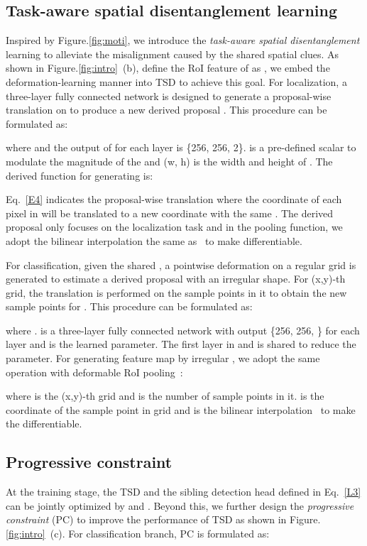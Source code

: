 \documentclass[10pt,twocolumn,letterpaper]{article}
\def \algfullname{\emph{task-aware spatial disentanglement}}
\def \algname{TSD}
\def \loss{PC}
\begin{document}
\subsection{Task-aware spatial disentanglement learning}\label{L1}
Inspired by Figure.\ref{fig:moti}, we introduce the \algfullname{} learning to alleviate the misalignment caused by the shared spatial clues.
As shown in Figure.\ref{fig:intro}~(b), define the RoI feature of  as , we embed the deformation-learning manner into \algname{} to achieve this goal.
For localization, a three-layer fully connected network  is designed to generate a proposal-wise translation on  to produce a new derived proposal . This procedure can be formulated as:

where  and the output of  for each layer is \{256, 256, 2\}.
 is a pre-defined scalar to modulate the magnitude of the  and (w, h) is the width and height of .
The derived function  for generating  is:

Eq.~\ref{E4} indicates the proposal-wise translation where the coordinate of each pixel in  will be translated to a new coordinate with the same .
The derived proposal  only focuses on the localization task and in the pooling function, we adopt the bilinear interpolation the same as~\cite{dai2017deformable} to make  differentiable.


For classification, given the shared ,
a pointwise deformation on a regular grid  is generated to estimate a derived proposal  with an irregular shape.
For (x,y)-th grid, the translation  is performed on the sample points in it to obtain the new sample points for .
This procedure can be formulated as:

where .  is a three-layer fully connected network with output \{256, 256, \} for each layer and  is the learned parameter. The first layer in  and  is shared to reduce the parameter.
For generating feature map  by irregular , we adopt the same operation with deformable RoI pooling~\cite{dai2017deformable}:

where  is the (x,y)-th grid and  is the number of sample points in it.
 is the coordinate of the sample point in grid  and  is the bilinear interpolation~\cite{dai2017deformable} to make the  differentiable.

\subsection{Progressive constraint}\label{L2}
At the training stage, the \algname{} and the sibling detection head defined in Eq.~\ref{L3} can be jointly optimized by  and .
Beyond this, we further design the \emph{progressive constraint} (\loss{}) to improve the performance of \algname{} as shown in Figure.\ref{fig:intro}~(c).
For classification branch, \loss{} is formulated as:
\end{document}
